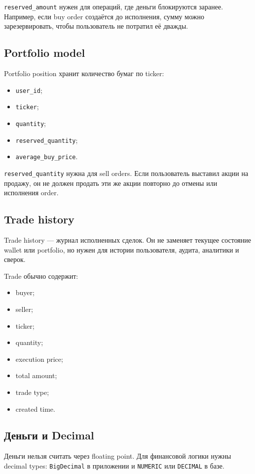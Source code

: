 \documentclass[12pt,a4paper]{article}
\begin{document}
\texttt{reserved\_amount} нужен для операций, где деньги блокируются заранее.
Например, если buy order создаётся до исполнения, сумму можно зарезервировать,
чтобы пользователь не потратил её дважды.

\subsection{Portfolio model}

Portfolio position хранит количество бумаг по ticker:
\begin{itemize}
    \item \texttt{user\_id};
    \item \texttt{ticker};
    \item \texttt{quantity};
    \item \texttt{reserved\_quantity};
    \item \texttt{average\_buy\_price}.
\end{itemize}

\texttt{reserved\_quantity} нужна для sell orders. Если пользователь выставил
акции на продажу, он не должен продать эти же акции повторно до отмены или
исполнения order.

\subsection{Trade history}

Trade history --- журнал исполненных сделок. Он не заменяет текущее состояние
wallet или portfolio, но нужен для истории пользователя, аудита, аналитики и
сверок.

Trade обычно содержит:
\begin{itemize}
    \item buyer;
    \item seller;
    \item ticker;
    \item quantity;
    \item execution price;
    \item total amount;
    \item trade type;
    \item created time.
\end{itemize}

\subsection{Деньги и Decimal}

Деньги нельзя считать через floating point. Для финансовой логики нужны decimal
types: \texttt{BigDecimal} в приложении и \texttt{NUMERIC} или \texttt{DECIMAL}
в базе.
\end{document}
